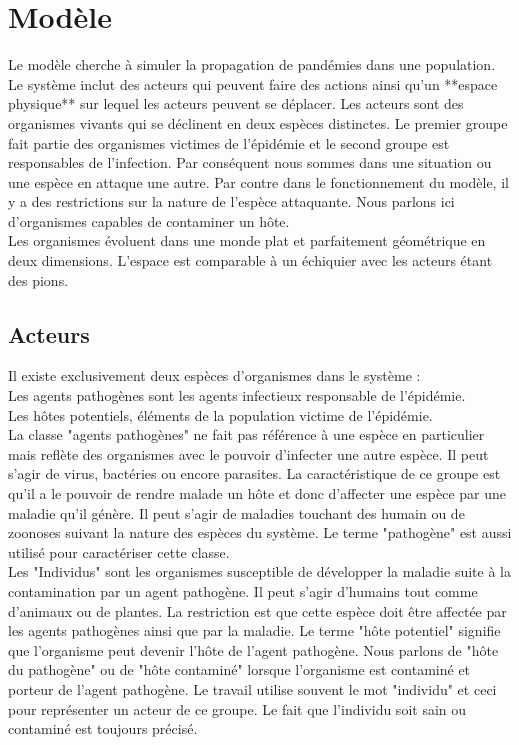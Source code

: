\chapter{Modèle} \label{ch:modele}

Le modèle cherche à simuler la propagation de pandémies dans une population. Le système inclut des acteurs qui peuvent faire des actions ainsi qu'un **espace physique** sur lequel les acteurs peuvent se déplacer. Les acteurs sont des organismes vivants qui se déclinent en deux espèces distinctes. Le premier groupe fait partie des organismes victimes de l'épidémie et le second groupe est responsables de l'infection. Par conséquent nous sommes dans une situation ou une espèce en attaque une autre. Par contre dans le fonctionnement du modèle, il y a des restrictions sur la nature de l'espèce attaquante. Nous parlons ici d'organismes capables de contaminer un hôte. \\

Les organismes évoluent dans une monde plat et parfaitement géométrique en deux dimensions. L'espace est comparable à un échiquier avec les acteurs étant des pions.

\section{Acteurs}

Il existe exclusivement deux espèces d'organismes dans le système :\\

Les agents pathogènes sont les agents infectieux responsable de l'épidémie.\\
Les hôtes potentiels, éléments de la population victime de l'épidémie.\\

La classe "agents pathogènes" ne fait pas référence à une espèce en particulier mais reflète des organismes avec le pouvoir d'infecter une autre espèce. Il peut s'agir de virus, bactéries ou encore parasites. La caractéristique de ce groupe est qu'il a le pouvoir de rendre malade un hôte et donc d'affecter une espèce par une maladie qu'il génère. Il peut s'agir de maladies touchant des humain ou de zoonoses suivant la nature des espèces du système. Le terme "pathogène" est aussi utilisé pour caractériser cette classe.\\

Les "Individus" sont les organismes susceptible de développer la maladie suite à la contamination par un agent pathogène. Il peut s'agir d'humains tout comme d'animaux ou de plantes. La restriction est que cette espèce doit être affectée par les agents pathogènes ainsi que par la maladie. Le terme "hôte potentiel" signifie que l'organisme peut devenir l'hôte de l'agent pathogène. Nous parlons de "hôte du pathogène" ou de "hôte contaminé" lorsque l'organisme est contaminé et porteur de l'agent pathogène. Le travail utilise souvent le mot "individu" et ceci pour représenter un acteur de ce groupe. Le fait que l'individu soit sain ou contaminé est toujours précisé.

